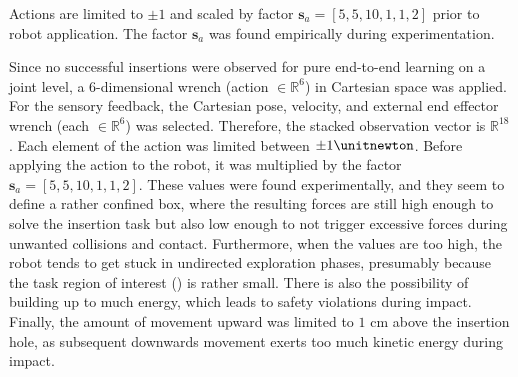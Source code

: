 Actions are limited to $\pm 1$ and scaled by factor $\boldsymbol{s}_a =[5,5,10,1,1,2]$ prior to robot application.
The factor $\boldsymbol{s}_a$ was found empirically during experimentation.

Since no successful insertions were observed for pure end-to-end learning on a joint level, a 6-dimensional wrench (action $\in \mathbb{R}^6$) in Cartesian space was applied.
For the sensory feedback, the Cartesian pose, velocity, and external end effector wrench (each $\in \mathbb{R}^6$) was selected.
Therefore, the stacked observation vector is $\mathbb{R}^{18}$.
Each element of the action was limited between $\pm 1\unitnewton$.
Before applying the action to the robot, it was multiplied by the factor $\boldsymbol{s}_a=[5,5,10,1,1,2]$.
These values were found experimentally, and they seem to define a rather confined box, where the resulting forces are still high enough to solve the insertion task but also low enough to not trigger excessive forces during unwanted collisions and contact.
Furthermore, when the values are too high, the robot tends to get stuck in undirected exploration phases, presumably because the task region of interest (\roi) is rather small.
There is also the possibility of building up to much energy, which leads to safety violations during impact. 
Finally, the amount of movement upward was limited to $1$ cm above the insertion hole, as subsequent downwards movement exerts too much kinetic energy during impact.

\paragraph{\skillmodelabbr{}}

